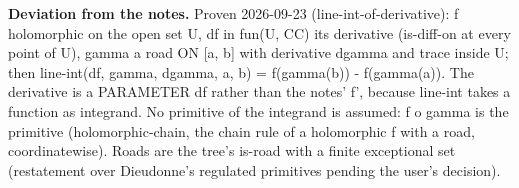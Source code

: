 %
\noindent\textbf{Deviation from the notes.} Proven 2026-09-23 (line-int-of-derivative): f holomorphic on the open set U, df in fun(U, CC) its derivative (is-diff-on at every point of U), gamma a road ON [a, b] with derivative dgamma and trace inside U; then line-int(df, gamma, dgamma, a, b) = f(gamma(b)) - f(gamma(a)). The derivative is a PARAMETER df rather than the notes' f', because line-int takes a function as integrand. No primitive of the integrand is assumed: f o gamma is the primitive (holomorphic-chain, the chain rule of a holomorphic f with a road, coordinatewise). Roads are the tree's is-road with a finite exceptional set (restatement over Dieudonne's regulated primitives pending the user's decision).
%
\renewcommand{\thethm}{3.3}
\begin{cor}\label{thm:line-int-closed-road-of-derivative}
%
\leavevmode
{}
%
\end{cor}
